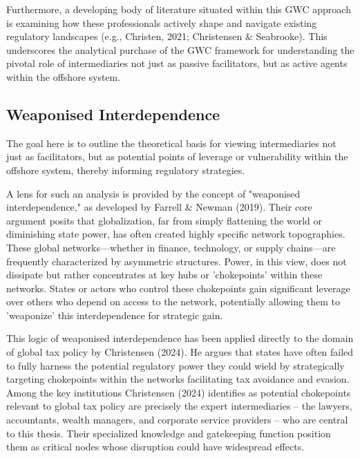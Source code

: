 Furthermore, a developing body of literature situated within this GWC approach is examining how these professionals actively shape and navigate existing regulatory landscapes (e.g., Christen, 2021; Christensen \& Seabrooke). This underscores the analytical purchase of the GWC framework for understanding the pivotal role of intermediaries not just as passive facilitators, but as active agents within the offshore system.

\subsection{Weaponised Interdependence}
\label{subsec:2_1_2}

The goal here is to outline the theoretical basis for viewing intermediaries not just as facilitators, but as potential points of leverage or vulnerability within the offshore system, thereby informing regulatory strategies.

A lens for such an analysis is provided by the concept of "weaponised interdependence," as developed by Farrell \& Newman (2019). Their core argument posits that globalization, far from simply flattening the world or diminishing state power, has often created highly specific network topographies. These global networks—whether in finance, technology, or supply chains—are frequently characterized by asymmetric structures. Power, in this view, does not dissipate but rather concentrates at key hubs or 'chokepoints' within these networks. States or actors who control these chokepoints gain significant leverage over others who depend on access to the network, potentially allowing them to 'weaponize' this interdependence for strategic gain.

This logic of weaponised interdependence has been applied directly to the domain of global tax policy by Christensen (2024). He argues that states have often failed to fully harness the potential regulatory power they could wield by strategically targeting chokepoints within the networks facilitating tax avoidance and evasion. Among the key institutions Christensen (2024) identifies as potential chokepoints relevant to global tax policy are precisely the expert intermediaries – the lawyers, accountants, wealth managers, and corporate service providers – who are central to this thesis. Their specialized knowledge and gatekeeping function position them as critical nodes whose disruption could have widespread effects.

